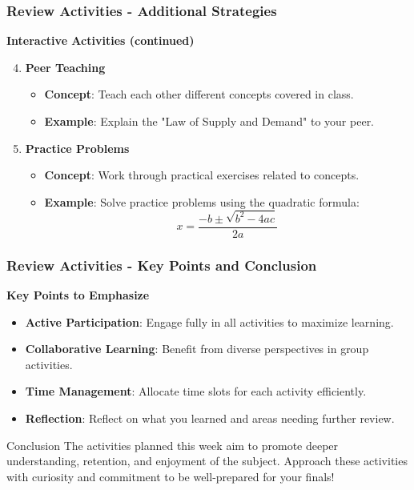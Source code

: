 \documentclass[aspectratio=169]{beamer}
\begin{document}
\begin{frame}[fragile]
    \frametitle{Review Activities - Additional Strategies}
    \textbf{Interactive Activities (continued)}
    \begin{enumerate}
        \setcounter{enumi}{3} %
        \item \textbf{Peer Teaching}
            \begin{itemize}
                \item \textbf{Concept}: Teach each other different concepts covered in class.
                \item \textbf{Example}: Explain the "Law of Supply and Demand" to your peer.
            \end{itemize}
        
        \item \textbf{Practice Problems}
            \begin{itemize}
                \item \textbf{Concept}: Work through practical exercises related to concepts.
                \item \textbf{Example}: Solve practice problems using the quadratic formula:
                \begin{equation}
                    x = \frac{-b \pm \sqrt{b^2 - 4ac}}{2a}
                \end{equation}
            \end{itemize}
    \end{enumerate}
\end{frame}

\begin{frame}[fragile]
    \frametitle{Review Activities - Key Points and Conclusion}
    \textbf{Key Points to Emphasize}
    \begin{itemize}
        \item \textbf{Active Participation}: Engage fully in all activities to maximize learning.
        \item \textbf{Collaborative Learning}: Benefit from diverse perspectives in group activities.
        \item \textbf{Time Management}: Allocate time slots for each activity efficiently.
        \item \textbf{Reflection}: Reflect on what you learned and areas needing further review.
    \end{itemize}

    \begin{block}{Conclusion}
        The activities planned this week aim to promote deeper understanding, retention, and enjoyment of the subject. Approach these activities with curiosity and commitment to be well-prepared for your finals!
    \end{block}
\end{frame}
\end{document}
